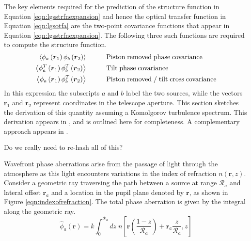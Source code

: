 The key elements required for the prediction of the structure function
in Equation \ref{eqn:lgsstrfnexpansion} and hence the optical transfer
function in Equation \ref{eqn:lgsotfa} are the two-point covariance
functions that appear in Equation \ref{eqn:lgsstrfnexpansion}.  The
following three such functions are required to compute the structure
function.
\begin{equation}\label{tpcf}
\begin{aligned}
\left\langle \phi_{a}\left(\boldsymbol{r}_{1}\right) \phi_{b}\left(\boldsymbol{r}_{2}\right) \right\rangle &\quad\quad\quad {\rm Piston\;removed\;phase\;covariance} \\
\left\langle \phi^{T}_{a}\left(\boldsymbol{r}_{1}\right) \phi^{T}_{b}\left(\boldsymbol{r}_{2}\right) \right\rangle &\quad\quad\quad {\rm Tilt\;phase\;covariance} \\
\left\langle \phi_{a}\left(\boldsymbol{r}_{1}\right) \phi^{T}_{b}\left(\boldsymbol{r}_{2}\right) \right\rangle &\quad\quad\quad {\rm Piston\;removed\;/\;tilt\;cross\;covariance} \\
\end{aligned}
\end{equation}
In this expression the subscripts $a$ and $b$ label the two sources,
while the vectors $\boldsymbol{r}_{1}$ and $\boldsymbol{r}_{2}$
represent coordinates in the telescope aperture.  This section
sketches the derivation of this quantity assuming a Komolgorov
turbulence spectrum.  This derivation appears in
\citet{Tyler:1994}, and is outlined here for
completeness.  A complementary approach appears in 
\citet{Sasiela:2007}.
\begin{notes}
Do we really need to re-hash all of this? 
\end{notes}

Wavefront phase aberrations arise from the passage of light through
the atmosphere as this light encounters variations in the index of
refraction $n\left(\boldsymbol{r},z\right)$.  Consider a geometric ray
traversing the path between a source at range $\mathcal{R}_{a}$ and
lateral offset $\boldsymbol{r}_{a}$ and a location in the pupil plane
denoted by $\boldsymbol{r}$, as shown in Figure
\ref{eqn:indexofrefraction}.  The total phase aberration is given by the integral
along the geometric ray.
\begin{equation}\label{eqn:totalphase_n}
\hat{\phi}_{a}\left(\boldsymbol{r}\right) = k \int_{0}^{\mathcal{R}_{a}} dz \; 
n\left[\boldsymbol{r}\left( \frac{1-z}{\mathcal{R}_{a}} \right) + \boldsymbol{r}_{a} \frac{z}{\mathcal{R}_{a}}, z\right]
\end{equation}


